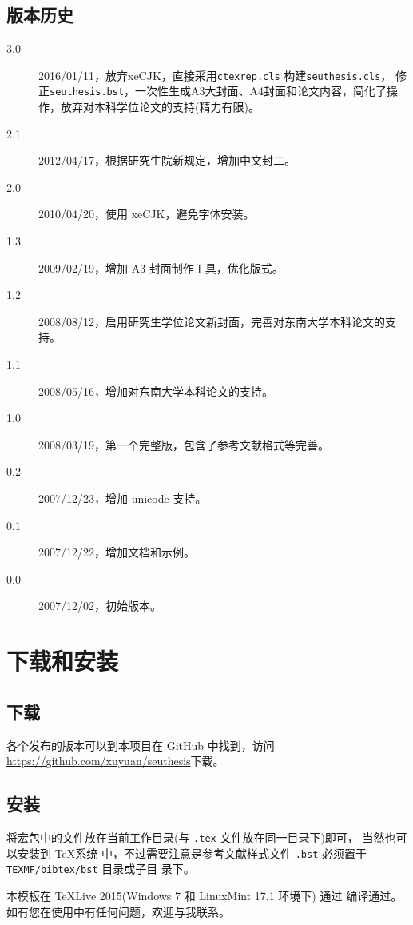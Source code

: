 ﻿\documentclass[figurelist,tablelist,algorithmlist,nomlist,masters]{seuthesis}
\begin{document}
\section{版本历史}
\begin{description}
\item[3.0] 2016/01/11，放弃xeCJK，直接采用\verb+ctexrep.cls+ 构建\verb+seuthesis.cls+，
修正\verb+seuthesis.bst+，一次性生成A3大封面、A4封面和论文内容，简化了操作，放弃对本科学位论文的支持(精力有限)。
\item[2.1] 2012/04/17，根据研究生院新规定，增加中文封二。
\item[2.0] 2010/04/20，使用 xeCJK，避免字体安装。
\item[1.3] 2009/02/19，增加 A3 封面制作工具，优化版式。
\item[1.2] 2008/08/12，启用研究生学位论文新封面，完善对东南大学本科论文的支持。
\item[1.1] 2008/05/16，增加对东南大学本科论文的支持。
\item[1.0] 2008/03/19，第一个完整版，包含了参考文献格式等完善。
\item[0.2] 2007/12/23，增加 unicode 支持。
\item[0.1] 2007/12/22，增加文档和示例。
\item[0.0] 2007/12/02，初始版本。
\end{description}

\chapter{下载和安装}
\section{下载}
各个发布的版本可以到本项目在 GitHub 中找到，访问
 \url{https://github.com/xuyuan/seuthesis}下载。
\section{安装}
将宏包中的文件放在当前工作目录(与 \verb+.tex+ 文件放在同一目录下)即可，
当然也可以安装到 \TeX 系统
中，不过需要注意是参考文献样式文件 \verb+.bst+ 必须置于 \verb+TEXMF/bibtex/bst+ 目录或子目
录下。

本模板在 \TeX{Live} 2015(Windows 7 和 LinuxMint 17.1 环境下) 通过 编译通过。
如有您在使用中有任何问题，欢迎与我联系。
\end{document}
